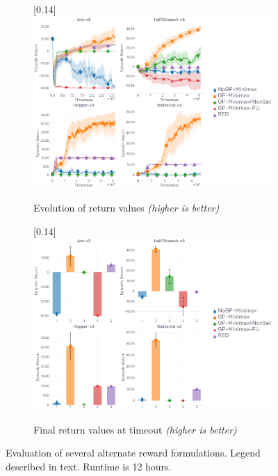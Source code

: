 \begin{figure}
  \center
  \begin{subfigure}[t]{0.49\textwidth}
    \center\scalebox{0.14}[0.14]{\includegraphics{Plots/fig05_rew_form_4envs/plots_eval_env_ret_plot.pdf}}
    \caption{Evolution of return values \textit{(higher is better)}}
  \end{subfigure}
  \begin{subfigure}[t]{0.49\textwidth}
    \center\scalebox{0.14}[0.14]{\includegraphics{Plots/fig05_rew_form_4envs/plots_eval_env_ret_barplot.pdf}}
    \caption{Final return values at timeout \textit{(higher is better)}}
  \end{subfigure}
  \caption{
  Evaluation of several alternate reward formulations.
  Legend described in text.
  Runtime is 12 hours.}
  \label{resplotsredpu}
\end{figure}

